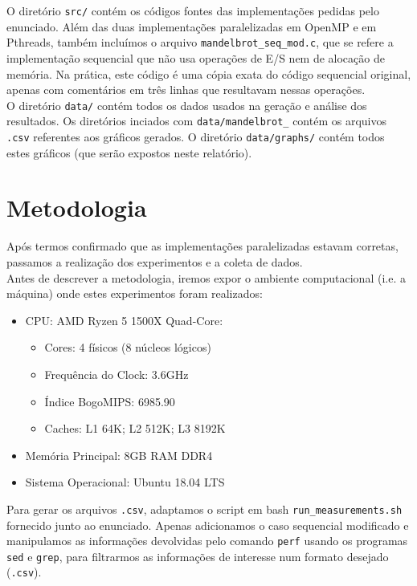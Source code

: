 \documentclass[a4paper, 12pt]{article}
\begin{document}
O diretório \texttt{src/} contém os códigos fontes das implementações pedidas pelo enunciado. Além das duas implementações paralelizadas em OpenMP e em Pthreads, também incluímos o arquivo \texttt{mandelbrot\_seq\_mod.c}, que se refere a implementação sequencial que não usa operações de E/S nem de alocação de memória. Na prática, este código é uma cópia exata do código sequencial original, apenas com comentários em três linhas que resultavam nessas operações.\\

O diretório \texttt{data/} contém todos os dados usados na geração e análise dos resultados. Os diretórios inciados com \texttt{data/mandelbrot\_} contém os arquivos \texttt{.csv} referentes aos gráficos gerados.  O diretório \texttt{data/graphs/} contém todos estes gráficos (que serão expostos neste relatório).\\

\section{Metodologia}

Após termos confirmado que as implementações paralelizadas estavam corretas, passamos a realização dos experimentos e a coleta de dados.\\

Antes de descrever a metodologia, iremos expor o ambiente computacional (i.e. a máquina) onde estes experimentos foram realizados:
\begin{itemize}
\item CPU: AMD Ryzen 5 1500X Quad-Core:
\begin{itemize}
\item Cores: 4 físicos (8 núcleos lógicos)
\item Frequência do Clock: 3.6GHz
\item Índice BogoMIPS: 6985.90
\item Caches: L1 64K; L2 512K; L3 8192K
\end{itemize}
\item Memória Principal: 8GB RAM DDR4
\item Sistema Operacional: Ubuntu 18.04 LTS
\end{itemize}
\hfill

Para gerar os arquivos \texttt{.csv}, adaptamos o script em bash \texttt{run\_measurements.sh} fornecido junto ao enunciado. Apenas adicionamos o caso sequencial modificado e manipulamos as informações devolvidas pelo comando \texttt{perf} usando os programas \texttt{sed} e \texttt{grep}, para filtrarmos as informações de interesse num formato desejado (\texttt{.csv}).\\
\end{document}
